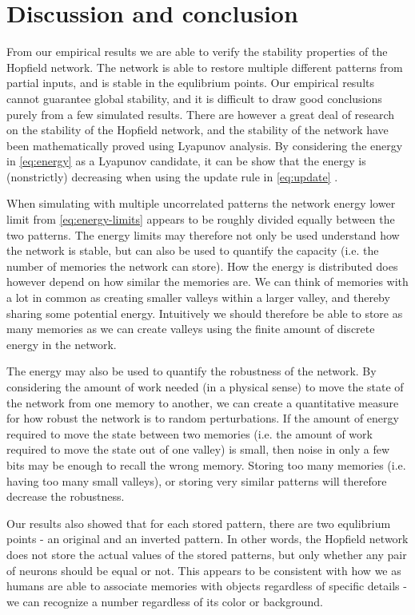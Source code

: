 \section{Discussion and conclusion}

From our empirical results we are able to verify the stability properties of the Hopfield network. The network is able to restore multiple different patterns from partial inputs, and is stable in the equlibrium points. Our empirical results cannot guarantee global stability, and it is difficult to draw good conclusions purely from a few simulated results. There are however a great deal of research on the stability of the Hopfield network, and the stability of the network have been mathematically proved using Lyapunov analysis. By considering the energy in \cref{eq:energy} as a Lyapunov candidate, it can be show that the energy is (nonstrictly) decreasing when using the update rule in \cref{eq:update} \cite{lyapnuv-stability}.

When simulating with multiple uncorrelated patterns the network energy lower limit from \cref{eq:energy-limits} appears to be roughly divided equally between the two patterns. The energy limits may therefore not only be used understand how the network is stable, but can also be used to quantify the capacity (i.e. the number of memories the network can store). How the energy is distributed does however depend on how similar the memories are. We can think of memories with a lot in common as creating smaller valleys within a larger valley, and thereby sharing some potential energy. Intuitively we should therefore be able to store as many memories as we can create valleys using the finite amount of discrete energy in the network.

The energy may also be used to quantify the robustness of the network. By considering the amount of work needed (in a physical sense) to move the state of the network from one memory to another, we can create a quantitative measure for how robust the network is to random perturbations. If the amount of energy required to move the state between two memories (i.e. the amount of work required to move the state out of one valley) is small, then noise in only a few bits may be enough to recall the wrong memory. Storing too many memories (i.e. having too many small valleys), or storing very similar patterns will therefore decrease the robustness.

Our results also showed that for each stored pattern, there are two equlibrium points - an original and an inverted pattern. In other words, the Hopfield network does not store the actual values of the stored patterns, but only whether any pair of neurons should be equal or not. This appears to be consistent with how we as humans are able to associate memories with objects regardless of specific details - we can recognize a number regardless of its color or background.

